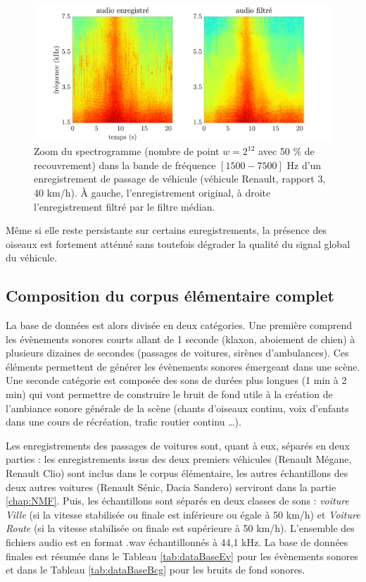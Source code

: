 \begin{figure}[t]
\centering
\includegraphics[width=.9\textwidth]{./figures/autres/filtrageMedian_VL1_R3_40_FR.pdf}
\caption{Zoom du spectrogramme (nombre de point $w = 2^{12}$ avec 50 $\%$ de recouvrement) dans la bande de fréquence $\left[1500-7500 \right]$ Hz d'un enregistrement de passage de véhicule (véhicule Renault, rapport 3, 40 km/h). \`A gauche, l'enregistrement original, à droite l'enregistrement filtré par le filtre médian.}
\label{fig:filtre_median}
\end{figure}


Même si elle reste persistante sur certains enregistrements, la présence des oiseaux est fortement atténué sans toutefois dégrader la qualité du signal global du véhicule.\\

\subsection{Composition du corpus élémentaire complet}

La base de données est alors divisée en deux catégories. Une première comprend les évènements sonores courts allant de 1 seconde (klaxon, aboiement de chien) à plusieurs dizaines de secondes (passages de voitures, sirènes d'ambulances). Ces éléments permettent de générer les évènements sonores émergeant dans une scène. Une seconde catégorie est composée des sons de durées plus longues (1 min à 2 min) qui vont permettre de construire le bruit de fond utile à la création de l'ambiance sonore générale de la scène (chants d'oiseaux continu, voix d'enfants dans une cours de récréation, trafic routier continu \dots). 

Les enregistrements des passages de voitures sont, quant à eux, séparés en deux parties : les enregistrements issus des deux premiers véhicules (Renault Mégane, Renault Clio) sont inclus dans le corpus élémentaire, les autres échantillons des deux autres voitures (Renault Sénic, Dacia Sandero) serviront dans la partie \ref{chap:NMF}.
Puis, les échantillons sont séparés en deux classes de sons : \textit{voiture Ville} (si la vitesse stabilisée ou finale est inférieure ou égale à 50 km/h) et \textit{Voiture Route} (si la vitesse stabilisée ou finale est supérieure à 50 km/h). L'ensemble des fichiers audio est en format .wav échantillonnés à 44,1 kHz. La base de données finales est résumée dans le Tableau \ref{tab:dataBaseEv} pour les évènements sonores et dans le Tableau \ref{tab:dataBaseBcg} pour les bruits de fond sonores. 

